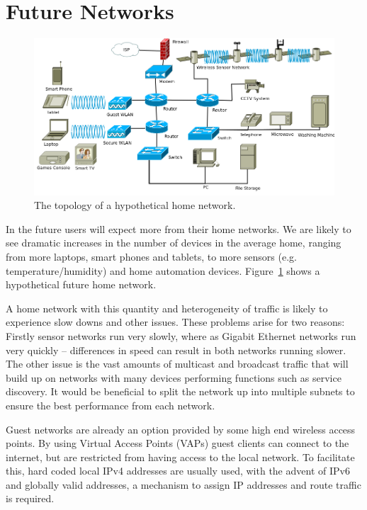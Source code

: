 \section{Future Networks}
\begin{figure}
\begin{center}
	\includegraphics[width=\linewidth]{../Diagrams/Network/FutureHomenet.png}
	\caption{The topology of a hypothetical home network.}\label{fig:future_net}
\end{center}
\end{figure}
In the future users will expect more from their home networks. We are likely to
see dramatic increases in the number of devices in the average home, ranging
from more laptops, smart phones and tablets, to more sensors (e.g.\@
temperature/humidity) and home automation devices. Figure~\ref{fig:future_net}
shows a hypothetical future home network.

A home network with this quantity and heterogeneity of traffic is likely to
experience slow downs and other issues. These problems arise for two reasons:
Firstly sensor networks run very slowly, where as Gigabit Ethernet networks run
very quickly -- differences in speed can result in both networks running
slower. The other issue is the vast amounts of multicast and broadcast
traffic that will build up on networks with many devices performing functions
such as service discovery. It would be beneficial to split the network up into
multiple subnets to ensure the best performance from each network. 

Guest networks are already an option provided by some high end wireless access
points. By using Virtual Access Points (VAPs)  guest clients can connect to the internet, but are restricted from
having access to the local network. To facilitate this, hard coded local
IPv4 addresses are usually used, with the advent of IPv6 and globally valid
addresses, a mechanism to assign IP addresses and route traffic is required. 

